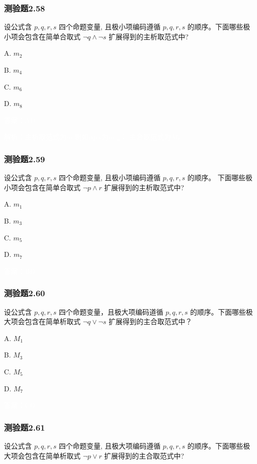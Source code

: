 \documentclass[UTF8, heading=true]{ctexart}
\begin{document}
\subsubsection{测验题2.58}

设公式含 $p, q, r, s$ 四个命题变量, 且极小项编码遵循 $p, q, r, s$ 的顺序。下面哪些极小项会包含在简单合取式 $\neg q \wedge \neg s$ 扩展得到的主析取范式中?

A. $ m_2$

B. $m_4$

C. $ m_6$

D. $ m_8$

\textcolor{white}{答案：AD}

\textcolor{white}{解析：主析取范式为$m$,例如$p \overline{q} r \overline{s}$为$m_{10}$；
主合取范式为$M$。}

\subsubsection{测验题2.59}

设公式含 $p, q, r, s$ 四个命题变量, 
且极小项编码遵循 $p, q, r, s$ 的顺序。
下面哪些极小项会包含在简单合取式 $\neg p \wedge r$ 
扩展得到的主析取范式中?

A. $ m_1$

B. $m_3$

C. $ m_5$

D. $ m_7$

\textcolor{white}{答案：BD}

\subsubsection{测验题2.60}

设公式含 $p, q, r, s$ 四个命题变量，且极大项编码道循 $p, q, r, s$ 的顺序。下面哪些极大项会包含在简单析取式 $\neg q \vee \neg s$ 扩展得到的主合取范式中？

A. $M_1$

B. $M_3$

C. $M_5$

D.  $M_7$

\textcolor{white}{答案：CD}

\subsubsection{测验题2.61}

设公式含 $p, q, r, s$ 四个命题变量, 且极大项编码遵循 $p, q, r, s$ 的顺序。下面哪些极大项会包含在简单析取式 
$\neg p \vee r$ 扩展得到的主合取范式中?
\end{document}
